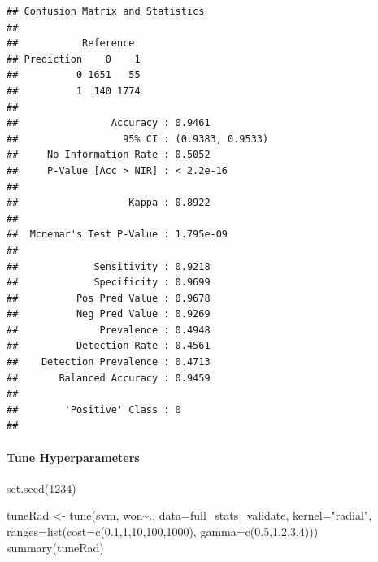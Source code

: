 \documentclass[
]{article}
\newenvironment{Shaded}{\begin{snugshade}}{\end{snugshade}}
\newcommand{\AttributeTok}[1]{\textcolor[rgb]{0.77,0.63,0.00}{#1}}
\newcommand{\DecValTok}[1]{\textcolor[rgb]{0.00,0.00,0.81}{#1}}
\newcommand{\FloatTok}[1]{\textcolor[rgb]{0.00,0.00,0.81}{#1}}
\newcommand{\FunctionTok}[1]{\textcolor[rgb]{0.00,0.00,0.00}{#1}}
\newcommand{\NormalTok}[1]{#1}
\newcommand{\OtherTok}[1]{\textcolor[rgb]{0.56,0.35,0.01}{#1}}
\newcommand{\SpecialCharTok}[1]{\textcolor[rgb]{0.00,0.00,0.00}{#1}}
\newcommand{\StringTok}[1]{\textcolor[rgb]{0.31,0.60,0.02}{#1}}
\begin{document}
\begin{verbatim}
## Confusion Matrix and Statistics
## 
##           Reference
## Prediction    0    1
##          0 1651   55
##          1  140 1774
##                                           
##                Accuracy : 0.9461          
##                  95% CI : (0.9383, 0.9533)
##     No Information Rate : 0.5052          
##     P-Value [Acc > NIR] : < 2.2e-16       
##                                           
##                   Kappa : 0.8922          
##                                           
##  Mcnemar's Test P-Value : 1.795e-09       
##                                           
##             Sensitivity : 0.9218          
##             Specificity : 0.9699          
##          Pos Pred Value : 0.9678          
##          Neg Pred Value : 0.9269          
##              Prevalence : 0.4948          
##          Detection Rate : 0.4561          
##    Detection Prevalence : 0.4713          
##       Balanced Accuracy : 0.9459          
##                                           
##        'Positive' Class : 0               
## 
\end{verbatim}

\hypertarget{tune-hyperparameters}{%
\paragraph{Tune Hyperparameters}\label{tune-hyperparameters}}

\begin{Shaded}
\begin{Highlighting}[]
\FunctionTok{set.seed}\NormalTok{(}\DecValTok{1234}\NormalTok{)}

\NormalTok{tuneRad }\OtherTok{\textless{}{-}} \FunctionTok{tune}\NormalTok{(svm, won}\SpecialCharTok{\textasciitilde{}}\NormalTok{., }\AttributeTok{data=}\NormalTok{full\_stats\_validate, }\AttributeTok{kernel=}\StringTok{"radial"}\NormalTok{, }\AttributeTok{ranges=}\FunctionTok{list}\NormalTok{(}\AttributeTok{cost=}\FunctionTok{c}\NormalTok{(}\FloatTok{0.1}\NormalTok{,}\DecValTok{1}\NormalTok{,}\DecValTok{10}\NormalTok{,}\DecValTok{100}\NormalTok{,}\DecValTok{1000}\NormalTok{), }\AttributeTok{gamma=}\FunctionTok{c}\NormalTok{(}\FloatTok{0.5}\NormalTok{,}\DecValTok{1}\NormalTok{,}\DecValTok{2}\NormalTok{,}\DecValTok{3}\NormalTok{,}\DecValTok{4}\NormalTok{)))}
\FunctionTok{summary}\NormalTok{(tuneRad)}
\end{Highlighting}
\end{Shaded}
\end{document}
